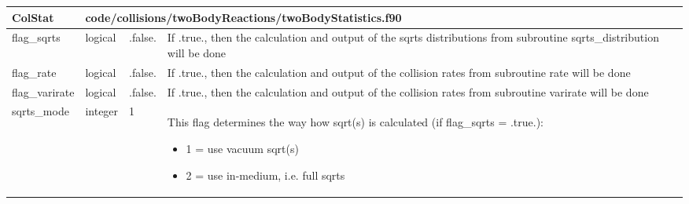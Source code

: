 \documentclass{article}
\begin{document}

\begin{longtable}{llll}
\toprule
\textbf{\large{ColStat}} & \multicolumn{3}{l}{\footnotesize{code/collisions/twoBodyReactions/twoBodyStatistics.f90}}\\*
\midrule
\endfirsthead
\midrule
\endhead
flag\_sqrts & \begin{minipage}[t]{2cm}logical\end{minipage} & \begin{minipage}[t]{2cm}.false.\end{minipage} & \begin{minipage}[t]{12cm}If .true., then the calculation and output of the sqrts distributions from subroutine sqrts\_distribution will be done\end{minipage}\\*
\midrule
flag\_rate & \begin{minipage}[t]{2cm}logical\end{minipage} & \begin{minipage}[t]{2cm}.false.\end{minipage} & \begin{minipage}[t]{12cm}If .true., then the calculation and output of the collision rates from subroutine rate will be done\end{minipage}\\*
\midrule
flag\_varirate & \begin{minipage}[t]{2cm}logical\end{minipage} & \begin{minipage}[t]{2cm}.false.\end{minipage} & \begin{minipage}[t]{12cm}If .true., then the calculation and output of the collision rates from subroutine varirate will be done\end{minipage}\\*
\midrule
sqrts\_mode & \begin{minipage}[t]{2cm}integer\end{minipage} & \begin{minipage}[t]{2cm}1\end{minipage} & \begin{minipage}[t]{12cm}This flag determines the way how sqrt(s) is calculated (if flag\_sqrts = .true.):\begin{itemize}\leftmargin0em\itemindent0pt\item 1 = use vacuum sqrt(s)\item 2 = use in-medium, i.e. full sqrts\end{itemize}\end{minipage}\\*

\end{longtable}
\end{document}
